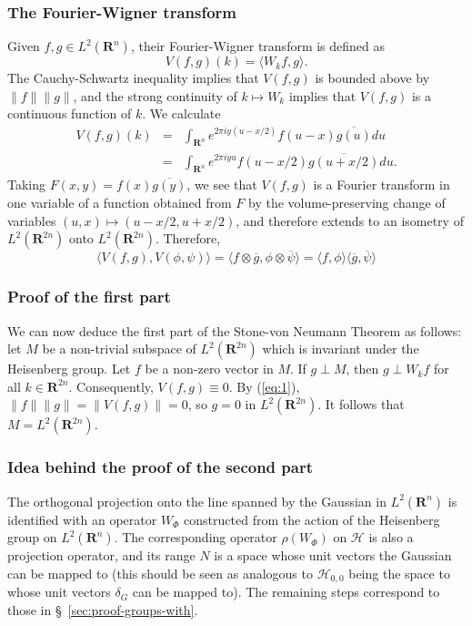 \documentclass[11pt]{amsart}
\numberwithin{equation}{section}
\theoremstyle{plain}
\theoremstyle{definition}
\newcommand{\Hilb}{\mathcal H}
\newcommand{\R}{\mathbf R}
\begin{document}
\subsubsection*{The Fourier-Wigner transform}
Given $f,g\in L^2(\R^n)$, their Fourier-Wigner transform is defined as
\begin{equation*}
  V(f,g)(k)=\langle W_k f,g\rangle.
\end{equation*}
The Cauchy-Schwartz inequality implies that $V(f,g)$ is bounded above by $\|f\|\|g\|$, and the strong continuity of $k\mapsto W_k$ implies that $V(f,g)$ is a continuous function of $k$.
We calculate
\begin{eqnarray*}
  V(f,g)(k)&=&\int_{\R^n} e^{2\pi i y(u-x/2)}f(u-x)\overline{g(u)}d u \\
  &=&\int_{\R^n}e^{2\pi i y u}f(u-x/2)\overline{g(u+x/2)} d u.
\end{eqnarray*}
Taking $F(x,y)=f(x)\overline{g(y)}$, we see that $V(f,g)$ is a Fourier transform in one variable of a function obtained from $F$ by the volume-preserving change of variables $(u,x)\mapsto (u-x/2,u+x/2)$, and therefore extends to an isometry of $L^2(\R^{2n})$ onto $L^2(\R^{2n})$.
Therefore,
\begin{equation}
  \label{eq:1}
  \langle V(f,g),V(\phi,\psi)\rangle = \langle f\otimes \overline g, \phi\otimes \overline \psi \rangle = \langle f,\phi\rangle \langle \overline g,\overline \psi\rangle
\end{equation}
\subsubsection*{Proof of the first part}
We can now deduce the first part of the Stone-von Neumann Theorem as follows: let $M$ be a non-trivial subspace of $L^2(\R^{2n})$ which is invariant under the Heisenberg group.
Let $f$ be a non-zero vector in $M$.
If $g\perp M$, then $g\perp W_k f$ for all $k\in \R^{2n}$.
Consequently, $V(f,g)\equiv 0$.
By (\ref{eq:1}), $\|f\|\|g\|=\|V(f,g)\|=0$, so $g=0$ in $L^2(\R^{2n})$.
It follows that $M=L^2(\R^{2n})$.
\subsubsection*{Idea behind the proof of the second part}
The orthogonal projection onto the line spanned by the Gaussian in $L^2(\R^n)$ is identified with an operator $W_\Phi$ constructed from the action of the Heisenberg group on $L^2(\R^n)$.
The corresponding operator $\rho(W_\Phi)$ on $\Hilb$ is also a projection operator, and its range $N$ is a space whose unit vectors the Gaussian can be mapped to (this should be seen as analogous to $\Hilb_{0,0}$ being the space to whose unit vectors $\delta_G$ can be mapped to).
The remaining steps correspond to those in \S~\ref{sec:proof-groups-with}.
\end{document}
